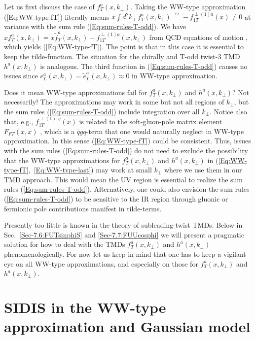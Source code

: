 \documentclass[a4paper,11pt]{article}
\def\kperp{k_\perp}
\begin{document}
Let us first discuss the case of $f_T^a(x,k_\perp)$. Taking the
WW-type approximation (\ref{Eq:WW-type-fT}) literally means
$x\int d^2 k_\perp\,f_T^a(x,k_\perp)\,\stackrel{!?}{=}
-f_{1T}^{\perp(1)a}(x)\neq0$
at variance with the sum rule (\ref{Eq:sum-rules-T-odd}). We
have $xf_T^a(x,k_\perp)=x\tilde{f}_T^a(x,k_\perp)-f_{1T}^{\perp(1)a}(x,k_\perp)$
from QCD equations of motion \cite{Bacchetta:2006tn}, which yields
(\ref{Eq:WW-type-fT}). The point is that in this case it is
essential to keep the tilde-function.
The situation for the chirally and T-odd twist-3
TMD $h^a(x,k_\perp)$ is analogous. The third
function in (\ref{Eq:sum-rules-T-odd}) causes no issues since
$e_L^a(x,k_\perp)=\tilde{e}_L^a(x,k_\perp)\approx0$ in WW-type approximation.

Does it mean WW-type approximations fail for $f_T^a(x,k_\perp)$
and $h^a(x,k_\perp)$? Not necessarily! The approximations may
work in some but not all regions of $\kperp$, but the sum rules
(\ref{Eq:sum-rules-T-odd}) include integration over all $k_\perp$.
Notice also that, e.g., $f_{1T}^{\perp (1),q}(x)$ is related to the
soft-gluon-pole matrix element $F_{FT}(x,x)$ \cite{Boer:2003cm,Ji:2006ub},
which is a $\bar{q}gq$-term that one would naturally neglect
in WW-type approximation.
In this sense (\ref{Eq:WW-type-fT}) could be consistent.
Thus, issues with the sum rules
(\ref{Eq:sum-rules-T-odd}) do not need to exclude the
possibility that the WW-type approximations for $f_T^a(x,k_\perp)$ and
$h^a(x,k_\perp)$ in (\ref{Eq:WW-type-fT},~\ref{Eq:WW-type-last})
may work at small $k_\perp$ where we use them in our TMD approach.
This would mean the UV region is essential to realize the sum rules
(\ref{Eq:sum-rules-T-odd}). Alternatively, one could also envision
the sum rules (\ref{Eq:sum-rules-T-odd}) to be sensitive to the
IR region through gluonic or fermionic pole contributions manifest
in tilde-terms.

Presently too little is known in the theory of subleading-twist TMDs.
Below in Sec.~\ref{Sec-7.6:FUTsinphiS} and \ref{Sec-7.7:FUUcosphi} we
will present a pragmatic solution for how to deal with the TMDs
$f_T^a(x,k_\perp)$ and $h^a(x,k_\perp)$ phenomenologically.
For now let us keep in mind that
one has to keep a vigilant eye on all WW-type approximations, and
especially on those for $f_T^a(x,k_\perp)$ and $h^a(x,k_\perp)$.



%
\section{SIDIS in the WW-type approximation and Gaussian model}
\label{Sec-4:SIDIS-in-WW-approximation}
\end{document}
